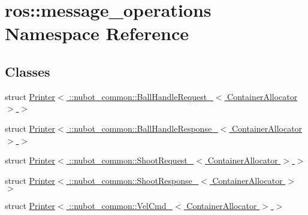 \hypertarget{namespaceros_1_1message__operations}{\section{ros\-:\-:message\-\_\-operations Namespace Reference}
\label{namespaceros_1_1message__operations}
}
\subsection*{Classes}
\begin{DoxyCompactItemize}
\item 
struct \hyperlink{structros_1_1message__operations_1_1Printer_3_01_1_1nubot__common_1_1BallHandleRequest___3_01ContainerAllocator_01_4_01_4}{Printer$<$ \-::nubot\-\_\-common\-::\-Ball\-Handle\-Request\-\_\-$<$ Container\-Allocator $>$ $>$}
\item 
struct \hyperlink{structros_1_1message__operations_1_1Printer_3_01_1_1nubot__common_1_1BallHandleResponse___3_01ContainerAllocator_01_4_01_4}{Printer$<$ \-::nubot\-\_\-common\-::\-Ball\-Handle\-Response\-\_\-$<$ Container\-Allocator $>$ $>$}
\item 
struct \hyperlink{structros_1_1message__operations_1_1Printer_3_01_1_1nubot__common_1_1ShootRequest___3_01ContainerAllocator_01_4_01_4}{Printer$<$ \-::nubot\-\_\-common\-::\-Shoot\-Request\-\_\-$<$ Container\-Allocator $>$ $>$}
\item 
struct \hyperlink{structros_1_1message__operations_1_1Printer_3_01_1_1nubot__common_1_1ShootResponse___3_01ContainerAllocator_01_4_01_4}{Printer$<$ \-::nubot\-\_\-common\-::\-Shoot\-Response\-\_\-$<$ Container\-Allocator $>$ $>$}
\item 
struct \hyperlink{structros_1_1message__operations_1_1Printer_3_01_1_1nubot__common_1_1VelCmd___3_01ContainerAllocator_01_4_01_4}{Printer$<$ \-::nubot\-\_\-common\-::\-Vel\-Cmd\-\_\-$<$ Container\-Allocator $>$ $>$}
\end{DoxyCompactItemize}
